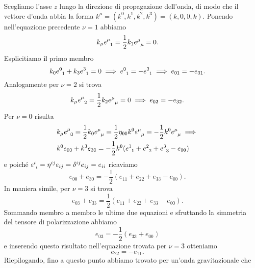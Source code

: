 Scegliamo l'asse $z$ lungo la direzione di propagazione dell'onda, di modo
che il vettore d'onda abbia la forma
$k^{\mu} = (k^{0}, k^{1}, k^{2}, k^{3}) = (k, 0, 0, k)$.  Ponendo nell'equazione
precedente $\nu = 1$ abbiamo
\begin{equation}
  k_{\mu}\tensor{e}{^{\mu}_{1}} = \frac{1}{2} k_{1}\tensor{e}{^{\mu}_{\mu}} = 0.
\end{equation}
Esplicitiamo il primo membro
\begin{equation}
  k_{0} \tensor{e}{^{0}_{1}} + k_{3} \tensor{e}{^{3}_{1}} = 0 \implies
  \tensor{e}{^{0}_{1}} = -\tensor{e}{^{3}_{1}} \implies e_{01} = -e_{31}.
\end{equation}
Analogamente per $\nu = 2$ si trova
\begin{equation}
  k_{\mu} \tensor{e}{^{\mu}_{2}} = \frac{1}{2} k_{2} \tensor{e}{^{\mu}_{\mu}} =
  0 \implies e_{02} = -e_{32}.
\end{equation}
Per $\nu = 0$ risulta
\begin{equation}
  \begin{split}
    &k_{\mu} \tensor{e}{^{\mu}_{0}} = \frac{1}{2} k_{0}\tensor{e}{^{\mu}_{\mu}}
    = \frac{1}{2}\eta_{00}k^{0}\tensor{e}{^{\mu}_{\mu}} =
    -\frac{1}{2}k^{0}\tensor{e}{^{\mu}_{\mu}} \implies \\
    &k^{0} e_{00} + k^{3}e_{30} = -\frac{1}{2}k^{0}(\tensor{e}{^{1}_{1}} +
    \tensor{e}{^{2}_{2}} + \tensor{e}{^{3}_{3}} - e_{00})
  \end{split}
\end{equation}
e poiché $\tensor{e}{^{i}_{i}} = \eta^{ij}e_{ij} = \delta^{ij}e_{ij} = e_{ii}$
ricaviamo
\begin{equation}
  e_{00} + e_{30} = -\frac{1}{2}(e_{11} + e_{22} + e_{33} - e_{00}).
\end{equation}
In maniera simile, per $\nu = 3$ si trova
\begin{equation}
  e_{03} + e_{33} = \frac{1}{2}(e_{11} + e_{22} + e_{33} - e_{00}).
\end{equation}
Sommando membro a membro le ultime due equazioni e sfruttando la simmetria del
tensore di polarizzazione abbiamo
\begin{equation}
  e_{03} = -\frac{1}{2}(e_{33} + e_{00})
\end{equation}
e inserendo questo risultato nell'equazione trovata per $\nu = 3$ otteniamo
\begin{equation}
  e_{22} = -e_{11}.
\end{equation}
Riepilogando, fino a questo punto abbiamo trovato per un'onda gravitazionale che
